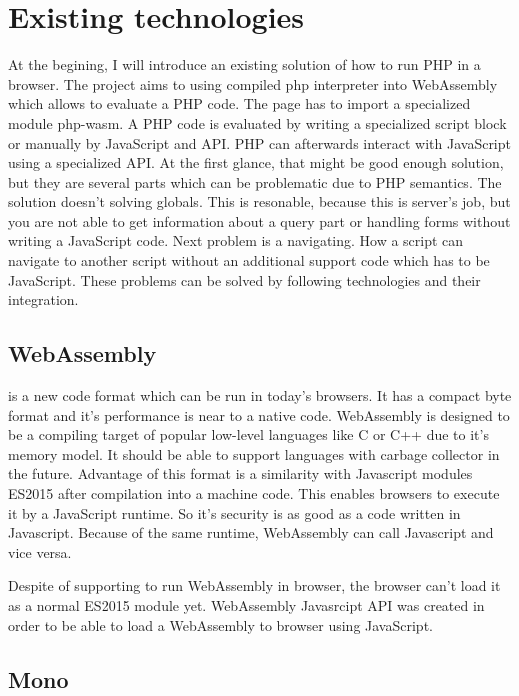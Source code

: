\chapter{Existing technologies}

At the begining, I will introduce an existing solution of how to run PHP in a browser. 
The project \cite{Pib} aims to using compiled php interpreter into WebAssembly which allows to evaluate a PHP code.
The page has to import a specialized module php-wasm. 
A PHP code is evaluated by writing a specialized script block or manually by JavaScript and API.
PHP can afterwards interact with JavaScript using a specialized API.
At the first glance, that might be good enough solution, but they are several parts which can be problematic due to PHP semantics.
The solution doesn't solving globals. 
This is resonable, because this is server's job, but you are not able to get information about a query part or handling forms without writing a JavaScript code.
Next problem is a navigating. How a script can navigate to another script without an additional support code which has to be JavaScript.
These problems can be solved by following technologies and their integration.

\section{WebAssembly}

\cite{WebAssembly} is a new code format which can be run in today's browsers. 
It has a compact byte format and it's performance is near to a native code. 
WebAssembly is designed to be a compiling target of popular low-level languages like C or C++ due to it's memory model. 
It should be able to support languages with carbage collector in the future. 
Advantage of this format is a similarity with Javascript modules ES2015 after compilation into a machine code. 
This enables browsers to execute it by a JavaScript runtime. 
So it's security is as good as a code written in Javascript. 
Because of the same runtime, WebAssembly can call Javascript and vice versa.

Despite of supporting to run WebAssembly in browser, the browser can't load it as a normal ES2015 module yet.
WebAssembly Javasrcipt API was created in order to be able to load a WebAssembly to browser using JavaScript.

\section{Mono}

